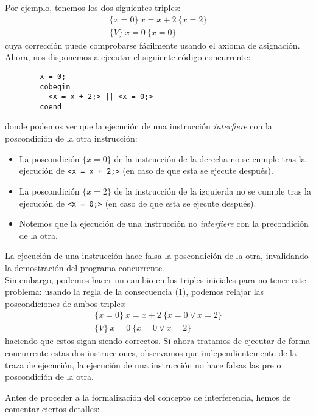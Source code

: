 \begin{ejemplo}
    Por ejemplo, tenemos los dos siguientes triples:
    \begin{gather*}
        \{x=0\}\ x=x+2\ \{x=2\} \\
        \{V\}\ x=0\ \{x=0\}
    \end{gather*}
    cuya corrección puede comprobarse fácilmente usando el axioma de asignación.\\

    Ahora, nos disponemos a ejecutar el siguiente código concurrente:
    \begin{verbatim}
        x = 0;
        cobegin
          <x = x + 2;> || <x = 0;>
        coend
    \end{verbatim}
    donde podemos ver que la ejecución de una instrucción \textit{interfiere} con la poscondición de la otra instrucción:
    \begin{itemize}
        \item La poscondición $\{x=0\}$ de la instrucción de la derecha no se cumple tras la ejecución de \verb|<x = x + 2;>| (en caso de que esta se ejecute después).
        \item La poscondición $\{x=2\}$ de la instrucción de la izquierda no se cumple tras la ejecución de \verb|<x = 0;>| (en caso de que esta se ejecute después).
        \item Notemos que la ejecución de una instrucción no \textit{interfiere} con la precondición de la otra.
    \end{itemize}
    La ejecución de una instrucción hace falsa la poscondición de la otra, invalidando la demostración del programa concurrente.\\

    Sin embargo, podemos hacer un cambio en los triples iniciales para no tener este problema: usando la regla de la consecuencia (1), podemos relajar las poscondiciones de ambos triples:
    \begin{gather*}
        \{x=0\}\ x=x+2\ \{x=0 \lor x=2\} \\
        \{V\}\ x=0\ \{x=0 \lor x=2\}
    \end{gather*}
    haciendo que estos sigan siendo correctos. Si ahora tratamos de ejecutar de forma concurrente estas dos instrucciones, observamos que independientemente de la traza de ejecución, la ejecución de una instrucción no hace falsas las pre o poscondición de la otra.
\end{ejemplo}
Antes de proceder a la formalización del concepto de interferencia, hemos de comentar ciertos detalles:\\

